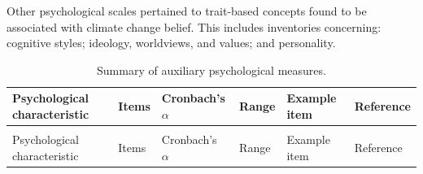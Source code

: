 \documentclass[
  letterpaper,
  DIV=11,
  numbers=noendperiod]{scrartcl}
\begin{document}
Other psychological scales pertained to trait-based concepts found to be
associated with climate change belief. This includes inventories
concerning: cognitive styles; ideology, worldviews, and values; and
personality.

\hypertarget{tbl-scales}{}
\begin{landscape}\begingroup\fontsize{7}{9}\selectfont

\begin{longtable}[t]{>{\raggedright\arraybackslash}p{20em}>{\raggedright\arraybackslash}p{3.5em}>{\raggedright\arraybackslash}p{6em}>{\raggedright\arraybackslash}p{3.5em}>{\raggedright\arraybackslash}p{30em}>{\raggedright\arraybackslash}p{13em}}
\caption{\label{tbl-scales}Summary of auxiliary psychological measures. }\tabularnewline

\toprule
Psychological characteristic & Items & Cronbach's $\alpha$ & Range & Example item & Reference\\
\midrule
\endfirsthead
\multicolumn{6}{@{}l}{\textit{(continued)}}\\
\toprule
Psychological characteristic & Items & Cronbach's $\alpha$ & Range & Example item & Reference\\
\midrule
\endhead


\end{longtable}
\end{landscape}
\end{document}
